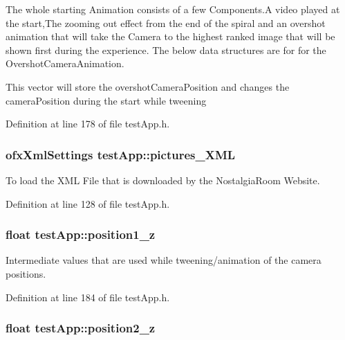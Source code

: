 The whole starting Animation consists of a few Components.\-A video played at the start,The zooming out effect from the end of the spiral and an overshot animation that will take the Camera to the highest ranked image that will be shown first during the experience. The below data structures are for for the Overshot\-Camera\-Animation. 

This vector will store the overshot\-Camera\-Position and changes the camera\-Position during the start while tweening 

Definition at line 178 of file test\-App.\-h.

\hypertarget{classtest_app_a85133f49103cfa002f39d882f7168236}{
\subsubsection[{pictures\-\_\-\-X\-M\-L}]{\setlength{\rightskip}{0pt plus 5cm}ofx\-Xml\-Settings test\-App\-::pictures\-\_\-\-X\-M\-L}}\label{classtest_app_a85133f49103cfa002f39d882f7168236}


To load the X\-M\-L File that is downloaded by the Nostalgia\-Room Website. 



Definition at line 128 of file test\-App.\-h.

\hypertarget{classtest_app_a808376783cdf510335cd1b37026e9bb3}{
\subsubsection[{position1\-\_\-z}]{\setlength{\rightskip}{0pt plus 5cm}float test\-App\-::position1\-\_\-z}}\label{classtest_app_a808376783cdf510335cd1b37026e9bb3}


Intermediate values that are used while tweening/animation of the camera positions. 



Definition at line 184 of file test\-App.\-h.

\hypertarget{classtest_app_a0720011cfaade6388109232ea4927c19}{
\subsubsection[{position2\-\_\-z}]{\setlength{\rightskip}{0pt plus 5cm}float test\-App\-::position2\-\_\-z}}\label{classtest_app_a0720011cfaade6388109232ea4927c19}



